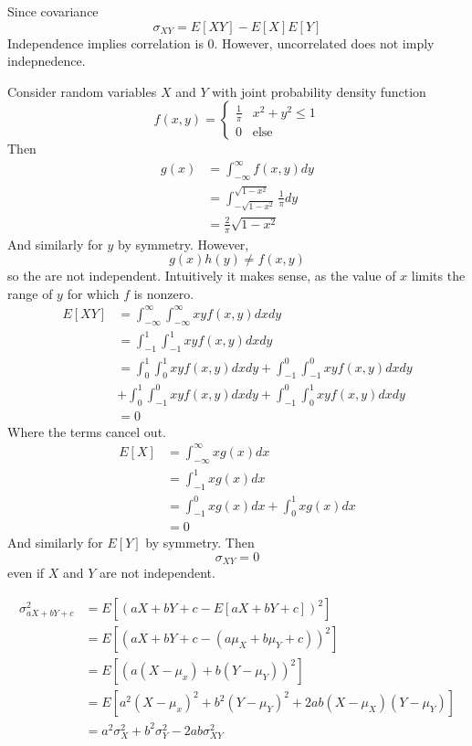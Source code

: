 \documentclass[12pt]{article}
\begin{document}
Since covariance
$$\sigma_{XY} = E[XY] - E[X]E[Y]$$
Independence implies correlation is 0. However, uncorrelated does not imply indepnedence.

\begin{ex}
	Consider random variables $X$ and $Y$ with joint probability density function
	$$f(x,y) = \begin{cases} \frac{1}{\pi} & x^2+y^2\leq1 \\ 0 & \text{else}\end{cases}$$
	Then
	\begin{align*}
		g(x) &= \int_{-\infty}^\infty f(x,y)dy \\
		     &= \int_{-\sqrt{1-x^2}}^{\sqrt{1-x^2}} \frac{1}{\pi}dy \\
		     &= \frac{2}{\pi}\sqrt{1-x^2}
	\end{align*}
	And similarly for $y$ by symmetry. However,
	$$g(x)h(y)\neq f(x,y)$$
	so the are not independent. Intuitively it makes sense, as the value of $x$ limits the range of $y$ for which $f$ is nonzero.
	\begin{align*}
		E[XY] &= \int_{-\infty}^\infty \int_{-\infty}^\infty xyf(x,y)dxdy \\
		      &= \int_{-1}^1 \int_{-1}^1 xyf(x,y)dxdy \\
		      &= \int_0^1 \int_0^1 xyf(x,y)dxdy + \int_{-1}^0 \int_{-1}^0 xyf(x,y)dxdy \\
		      &+ \int_0^1 \int_{-1}^0 xyf(x,y)dxdy + \int_{-1}^0 \int_0^1 xyf(x,y)dxdy \\
		      &= 0
	\end{align*}
	Where the terms cancel out.
	\begin{align*}
		E[X] &= \int_{-\infty}^\infty xg(x)dx \\
		     &= \int_{-1}^1 xg(x)dx \\
		     &= \int_{-1}^0 xg(x)dx + \int_0^1 xg(x)dx \\
		     &= 0
	\end{align*}
	And similarly for $E[Y]$ by symmetry. Then
	$$\sigma_{XY} = 0$$
	even if $X$ and $Y$ are not independent.
\end{ex}

\begin{ex}
	\begin{align*}
		\sigma^2_{aX+bY+c} &= E[(aX+bY+c - E[aX+bY+c])^2] \\
				   &= E[(aX+bY+c - (a\mu_X + b\mu_Y + c))^2] \\
				   &= E[(a(X-\mu_x) + b(Y-\mu_Y))^2] \\
				   &= E[a^2(X-\mu_x)^2 + b^2(Y-\mu_Y)^2 + 2ab(X-\mu_X)(Y-\mu_Y)] \\
				   &= a^2\sigma_X^2 + b^2\sigma_Y^2 - 2ab\sigma_{XY}^2
	\end{align*}
\end{ex}
\end{document}
